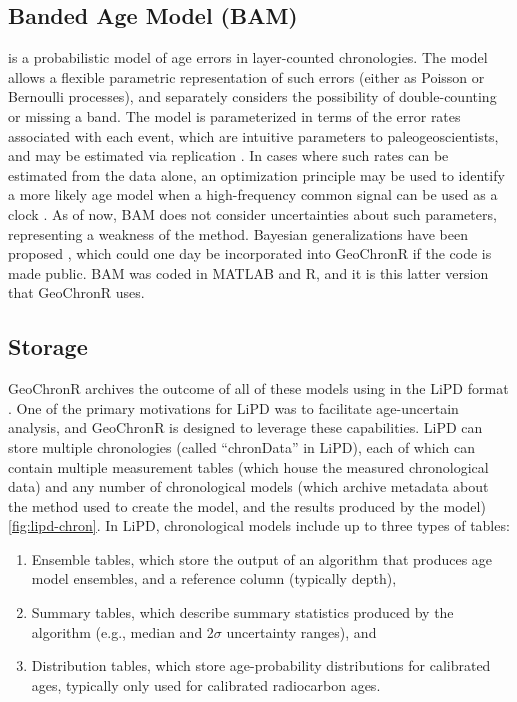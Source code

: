\documentclass[gchron, manuscript]{copernicus}
\begin{document}
\subsection{Banded Age Model (BAM)}

\citet{BAM} is a probabilistic model of age errors in layer-counted chronologies.
The model allows a flexible parametric representation of such errors (either as Poisson or Bernoulli processes), and separately considers the possibility of double-counting or missing a band.
The model is parameterized in terms of the error rates associated with each event, which are intuitive parameters to paleogeoscientists, and may be estimated via replication \citep{DeLong_Paleo3_2013}.
In cases where such rates can be estimated from the data alone, an optimization principle may be used to identify a more likely age model when a high-frequency common signal can be used as a clock \citep{BAM}.
As of now, BAM does not consider uncertainties about such parameters, representing a weakness of the method.
Bayesian generalizations have been proposed \citep{BoersCP2017}, which could one day be incorporated into GeoChronR if the code is made public.
BAM was coded in MATLAB and R, and it is this latter version that GeoChronR uses.

\subsection{Storage}

GeoChronR archives the outcome of all of these models using in the LiPD format \citep{lipd_cp}.
One of the primary motivations for LiPD was to facilitate age-uncertain analysis, and GeoChronR is designed to leverage these capabilities.
LiPD can store multiple chronologies (called ``chronData'' in LiPD), each of which can contain multiple measurement tables (which house the measured chronological data) and any number of chronological models (which archive metadata about the method used to create the model, and the results produced by the model) \ref{fig:lipd-chron}.
In LiPD, chronological models include up to three types of tables:

\begin{enumerate}
\def\labelenumi{\arabic{enumi}.}
\item
  Ensemble tables, which store the output of an algorithm that produces age model ensembles, and a reference column (typically depth),
\item
  Summary tables, which describe summary statistics produced by the algorithm (e.g., median and 2\(\sigma\) uncertainty ranges), and
\item
  Distribution tables, which store age-probability distributions for calibrated ages, typically only used for calibrated radiocarbon ages.
\end{enumerate}
\end{document}
